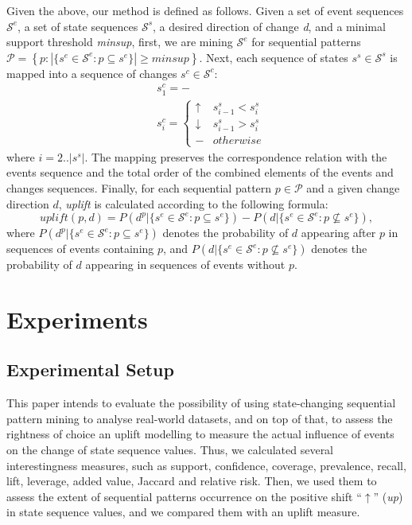 \documentclass[runningheads,a4paper]{llncs}
\begin{document}
Given the above, our method is defined as follows.
Given a set of event sequences $\mathcal{S}^e$, a set of state sequences $\mathcal{S}^s$, a desired direction of change \textit{d}, and a minimal support threshold \textit{minsup}, first, we are mining $\mathcal{S}^e$ for sequential patterns $\mathcal{P}=\left\{p:|\{s^e\in\mathcal{S}^e:p\subseteq s^e\}|\geq\textit{minsup}\right\}$.
Next, each sequence of states $s^s\in\mathcal{S}^s$ is mapped into a sequence of changes $s^c\in\mathcal{S}^c$:
\begin{equation*}
\begin{split}
&s^c_1=-\\
&s^c_i=\begin{cases}
	\uparrow & s^s_{i-1}<s^s_i \\
	\downarrow & s^s_{i-1}>s^s_i \\
	- & otherwise
\end{cases}
\end{split}
\end{equation*}
where $i=2..|s^s|$.
The mapping preserves the correspondence relation with the events sequence and the total order of the combined elements of the events and changes sequences.
Finally, for each sequential pattern $p\in\mathcal{P}$ and a given change direction $d$, \textit{uplift} is calculated according to the following formula:
\begin{equation*}
\textit{uplift}(p,d)=P(d^p|\{s^e\in\mathcal{S}^e:p\subseteq s^e\})-P(d|\{s^e\in\mathcal{S}^e:p\not\subseteq s^e\}),
\end{equation*}
where $P(d^p|\{s^e\in\mathcal{S}^e:p\subseteq s^e\})$ denotes the probability of $d$ appearing after $p$ in sequences of events containing $p$, and $P(d|\{s^e\in\mathcal{S}^e:p\not\subseteq s^e\})$ denotes the probability of $d$ appearing in sequences of events without $p$.

\section{Experiments}
\label{sec:experiments}
\subsection{Experimental Setup}
This paper intends to evaluate the possibility of using state-changing sequential pattern mining to analyse real-world datasets, and on top of that, to assess the rightness of choice an uplift modelling to measure the actual influence of events on the change of state sequence values. Thus, we calculated several interestingness measures, such as support, confidence, coverage, prevalence, recall, lift, leverage, added value, Jaccard and relative risk. Then, we used them to assess the extent of sequential patterns occurrence on the positive shift ``$\uparrow$'' (\textit{up}) in state sequence values, and we compared them with an uplift measure.
\end{document}
